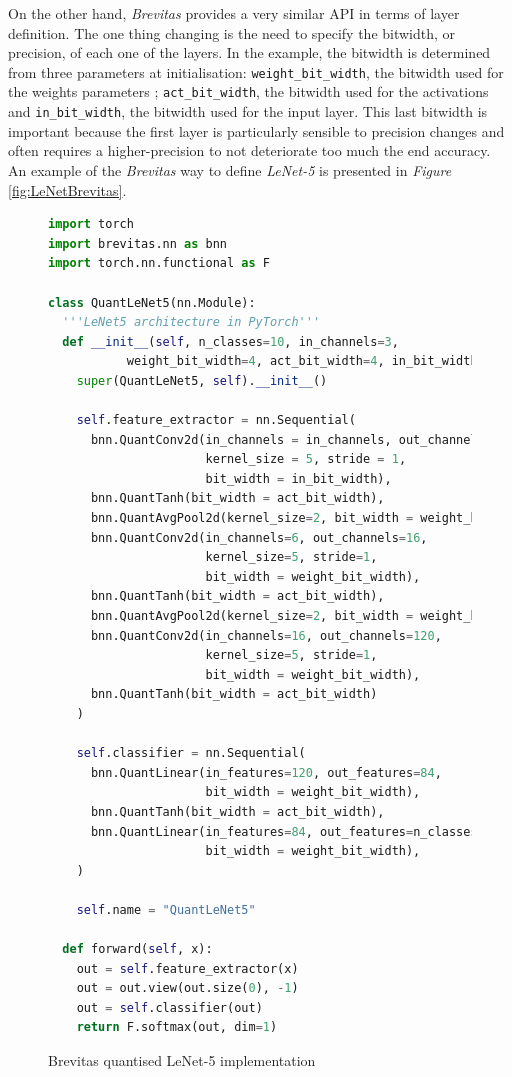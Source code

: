 On the other hand, \emph{Brevitas} provides a very similar API in terms of layer definition. The one thing changing is the need to specify the bitwidth, or precision, of each one of the layers. In the example, the bitwidth is determined from three parameters at initialisation: \texttt{weight\_bit\_width}, the bitwidth used for the weights parameters ; \texttt{act\_bit\_width}, the bitwidth used for the activations and \texttt{in\_bit\_width}, the bitwidth used for the input layer. This last bitwidth is important because the first layer is particularly sensible to precision changes and often requires a higher-precision to not deteriorate too much the end accuracy. An example of the \emph{Brevitas} way to define \emph{LeNet-5} is presented in \emph{Figure} \ref{fig:LeNetBrevitas}.


\begin{figure}[htbp]
\centering
\begin{lstlisting}[language=Python]
import torch
import brevitas.nn as bnn
import torch.nn.functional as F

class QuantLeNet5(nn.Module):
  '''LeNet5 architecture in PyTorch'''
  def __init__(self, n_classes=10, in_channels=3,
           weight_bit_width=4, act_bit_width=4, in_bit_width=8):
    super(QuantLeNet5, self).__init__()

    self.feature_extractor = nn.Sequential(
      bnn.QuantConv2d(in_channels = in_channels, out_channels = 6,
                      kernel_size = 5, stride = 1,
                      bit_width = in_bit_width),
      bnn.QuantTanh(bit_width = act_bit_width),
      bnn.QuantAvgPool2d(kernel_size=2, bit_width = weight_bit_width),
      bnn.QuantConv2d(in_channels=6, out_channels=16,
                      kernel_size=5, stride=1,
                      bit_width = weight_bit_width),
      bnn.QuantTanh(bit_width = act_bit_width),
      bnn.QuantAvgPool2d(kernel_size=2, bit_width = weight_bit_width),
      bnn.QuantConv2d(in_channels=16, out_channels=120,
                      kernel_size=5, stride=1,
                      bit_width = weight_bit_width),
      bnn.QuantTanh(bit_width = act_bit_width)
    )

    self.classifier = nn.Sequential(
      bnn.QuantLinear(in_features=120, out_features=84,
                      bit_width = weight_bit_width),
      bnn.QuantTanh(bit_width = act_bit_width),
      bnn.QuantLinear(in_features=84, out_features=n_classes,
                      bit_width = weight_bit_width),
    )

    self.name = "QuantLeNet5"

  def forward(self, x):
    out = self.feature_extractor(x)
    out = out.view(out.size(0), -1)
    out = self.classifier(out)
    return F.softmax(out, dim=1)
\end{lstlisting}
\caption[LeNetBrevitas]{Brevitas quantised LeNet-5 \cite{LeCun1998} implementation}
	\label{fig:LeNetPyTorch}
\end{figure}

